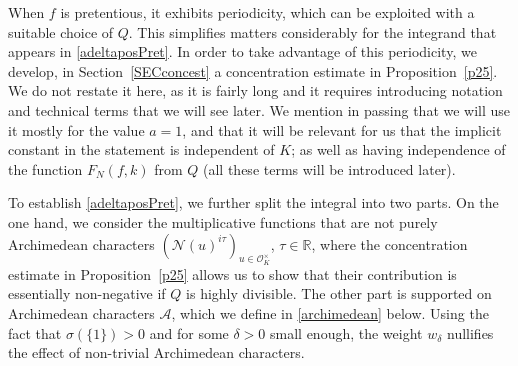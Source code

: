 \documentclass[11pt]{amsart}
\newtheorem{proposition}[lemma]{Proposition}
\theoremstyle{definition}
\newtheorem*{remark}{Remark}
\DeclareMathOperator*{\E}{\mathbb{E}}
\newcommand{\D}{{\mathbb D}}
\newcommand{\NN}{{\mathcal N}}
\newcommand{\R}{{\mathbb R}}
\newcommand{\Z}{{\mathbb Z}}
\newcommand{\U}{{\mathbb U}}
\begin{document}
When $f$ is pretentious, it exhibits periodicity, which can be exploited with a suitable choice of $Q$. This simplifies matters considerably for the integrand that appears in \eqref{adeltaposPret}. In order to take advantage of this periodicity, we develop, in Section~\ref{SECconcest} a concentration estimate in Proposition~\ref{p25}. We do not restate it here, as it is fairly long and it requires introducing notation and technical terms that we will see later.
We mention in passing that we will use it mostly for the value $a=1$, and that it will be relevant for us that the implicit constant in the statement is independent of $K$; as well as having independence of the function $F_N(f,k)$ from $Q$ (all these terms will be introduced later).

To establish \eqref{adeltaposPret}, we further split the integral into two parts. On the one hand, we consider the multiplicative functions that are not purely Archimedean characters $(\NN(u)^{i\tau})_{u \in \mathcal{O}_K^{\times}}$, $\tau \in \R$, where the concentration estimate in Proposition~\ref{p25} allows us to show that their contribution is essentially non-negative if $Q$ is highly divisible. The other part is supported on Archimedean characters $\mathcal{A}$, which we define in \eqref{archimedean} below. Using the fact that $\sigma(\{1\})>0$ and for some $\delta>0$ small enough, the weight $w_{\delta}$ nullifies the effect of non-trivial Archimedean characters. 
\end{document}
